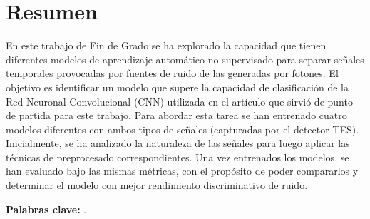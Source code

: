 %
%
%
% 
%
%
%
%

\chapter*{Resumen}
\label{cha:resumen}


En este trabajo de Fin de Grado se ha explorado la capacidad que tienen diferentes modelos de aprendizaje automático no supervisado para separar señales temporales provocadas por 
fuentes de ruido de las generadas por fotones. El objetivo es identificar un modelo que supere la capacidad de clasificación de la Red Neuronal Convolucional (CNN) utilizada en el artículo que sirvió de punto de partida para este trabajo.
Para abordar esta tarea se han entrenado cuatro modelos diferentes con ambos tipos de señales (capturadas por el detector TES). Inicialmente, se ha analizado la naturaleza de las señales para luego aplicar las 
técnicas de preprocesado correspondientes. Una vez entrenados los modelos, se han evaluado bajo las mismas métricas, con el propósito de poder compararlos y determinar el modelo con mejor rendimiento discriminativo de ruido.

\textbf{Palabras clave:} \myThesisKeywords.



